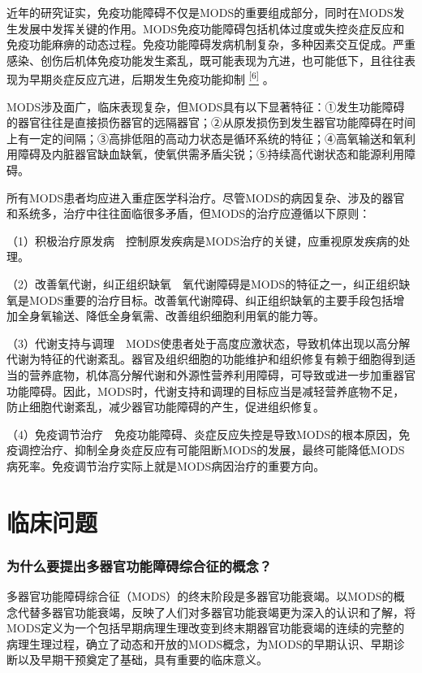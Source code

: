 近年的研究证实，免疫功能障碍不仅是MODS的重要组成部分，同时在MODS发生发展中发挥关键的作用。MODS免疫功能障碍包括机体过度或失控炎症反应和免疫功能麻痹的动态过程。免疫功能障碍发病机制复杂，多种因素交互促成。严重感染、创伤后机体免疫功能发生紊乱，既可能表现为亢进，也可能低下，且往往表现为早期炎症反应亢进，后期发生免疫功能抑制
\protect\hyperlink{text00007.htmlux5cux23ch6-6}{\textsuperscript{{[}6{]}}}
。

MODS涉及面广，临床表现复杂，但MODS具有以下显著特征：①发生功能障碍的器官往往是直接损伤器官的远隔器官；②从原发损伤到发生器官功能障碍在时间上有一定的间隔；③高排低阻的高动力状态是循环系统的特征；④高氧输送和氧利用障碍及内脏器官缺血缺氧，使氧供需矛盾尖锐；⑤持续高代谢状态和能源利用障碍。

所有MODS患者均应进入重症医学科治疗。尽管MODS的病因复杂、涉及的器官和系统多，治疗中往往面临很多矛盾，但MODS的治疗应遵循以下原则：

（1）积极治疗原发病　控制原发疾病是MODS治疗的关键，应重视原发疾病的处理。

（2）改善氧代谢，纠正组织缺氧　氧代谢障碍是MODS的特征之一，纠正组织缺氧是MODS重要的治疗目标。改善氧代谢障碍、纠正组织缺氧的主要手段包括增加全身氧输送、降低全身氧需、改善组织细胞利用氧的能力等。

（3）代谢支持与调理　MODS使患者处于高度应激状态，导致机体出现以高分解代谢为特征的代谢紊乱。器官及组织细胞的功能维护和组织修复有赖于细胞得到适当的营养底物，机体高分解代谢和外源性营养利用障碍，可导致或进一步加重器官功能障碍。因此，MODS时，代谢支持和调理的目标应当是减轻营养底物不足，防止细胞代谢紊乱，减少器官功能障碍的产生，促进组织修复。

（4）免疫调节治疗　免疫功能障碍、炎症反应失控是导致MODS的根本原因，免疫调控治疗、抑制全身炎症反应有可能阻断MODS的发展，最终可能降低MODS病死率。免疫调节治疗实际上就是MODS病因治疗的重要方向。

\section{临床问题}

\subsubsection{为什么要提出多器官功能障碍综合征的概念？}

多器官功能障碍综合征（MODS）的终末阶段是多器官功能衰竭。以MODS的概念代替多器官功能衰竭，反映了人们对多器官功能衰竭更为深入的认识和了解，将MODS定义为一个包括早期病理生理改变到终末期器官功能衰竭的连续的完整的病理生理过程，确立了动态和开放的MODS概念，为MODS的早期认识、早期诊断以及早期干预奠定了基础，具有重要的临床意义。

